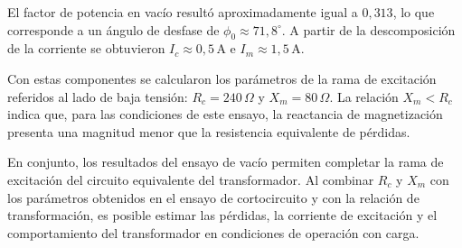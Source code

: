 El factor de potencia en vacío resultó aproximadamente igual a $0,313$, lo que corresponde a un ángulo de desfase de $\phi_0\approx71,8^{\circ}$. A partir de la descomposición de la corriente se obtuvieron $I_c\approx0,5\,\mathrm{A}$ e $I_m\approx1,5\,\mathrm{A}$.

Con estas componentes se calcularon los parámetros de la rama de excitación referidos al lado de baja tensión: $R_c=240\,\Omega$ y $X_m=80\,\Omega$. La relación $X_m<R_c$ indica que, para las condiciones de este ensayo, la reactancia de magnetización presenta una magnitud menor que la resistencia equivalente de pérdidas.

En conjunto, los resultados del ensayo de vacío permiten completar la rama de excitación del circuito equivalente del transformador. Al combinar $R_c$ y $X_m$ con los parámetros obtenidos en el ensayo de cortocircuito y con la relación de transformación, es posible estimar las pérdidas, la corriente de excitación y el comportamiento del transformador en condiciones de operación con carga.

